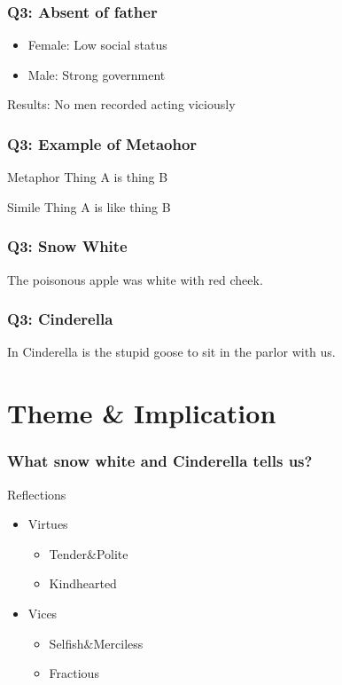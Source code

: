 \documentclass{beamer}
\begin{document}
\begin{frame}
    \frametitle{Q3: Absent of father}
    \begin{itemize}
        \item Female: Low social status
        \item Male: Strong government
    \end{itemize}
    \huge{\alert{Results: No men recorded acting viciously}}
\end{frame}

\begin{frame}
    \frametitle{Q3: Example of Metaohor}
    \begin{block}{Metaphor}
        Thing A is thing B
    \end{block}


    \begin{block}{Simile}
        Thing A is like thing B
    \end{block}
\end{frame}

\begin{frame}
    \frametitle{Q3: Snow White}
    \Huge{The poisonous apple was white with red cheek.}
\end{frame}

\begin{frame}
    \frametitle{Q3: Cinderella}
    \Huge{In Cinderella is the stupid goose to sit in the parlor with us.}
\end{frame}

\section{Theme \& Implication}
\begin{frame}
    \frametitle{What snow white and Cinderella tells us?}
    \begin{block}{Reflections}
        \begin{itemize}
            \item Virtues
                  \begin{itemize}
                      \item Tender$\&$Polite
                      \item Kindhearted
                  \end{itemize}
            \item Vices
                  \begin{itemize}
                      \item Selfish$\&$Merciless
                      \item Fractious
                  \end{itemize}
        \end{itemize}
    \end{block}
\end{frame}
\end{document}
